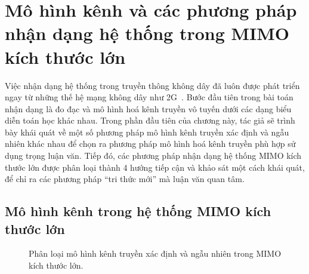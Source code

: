 \clearpage
{}

\setcounter{chapter}{0}
\chapter[MÔ HÌNH KÊNH VÀ CÁC PHƯƠNG PHÁP NHẬN DẠNG HỆ THỐNG TRONG MIMO KÍCH THƯỚC LỚN]{Mô hình kênh và các phương pháp nhận dạng hệ thống trong MIMO kích thước lớn}
\label{sec:back}
Việc nhận dạng hệ thống trong truyền thông không dây đã luôn được phát triển ngay từ những thế hệ mạng không dây như 2G~\cite{Tse2005}. Bước đầu tiên trong bài toán nhận dạng là đo đạc và mô hình hoá kênh truyền vô tuyến dưới các dạng biểu diễn toán học khác nhau. Trong phần đầu tiên của chương này, tác giả sẽ trình bày khái quát về một số phương pháp mô hình kênh truyền xác định và ngẫu nhiên khác nhau để chọn ra phương pháp mô hình hoá kênh truyền phù hợp sử dụng trọng luận văn. Tiếp đó, các phương pháp nhận dạng hệ thống MIMO kích thước lớn được phân loại thành 4 hướng tiếp cận và khảo sát một cách khái quát, để chỉ ra các phương pháp ``tri thức mới'' mà luận văn quan tâm.

\section{Mô hình kênh trong hệ thống MIMO kích thước lớn}

\begin{figure}[H]
    \centering
    \caption{Phân loại mô hình kênh truyền xác định và ngẫu nhiên trong MIMO kích thước lớn.}
    \label{fig:classify_MIMO}
\end{figure}

